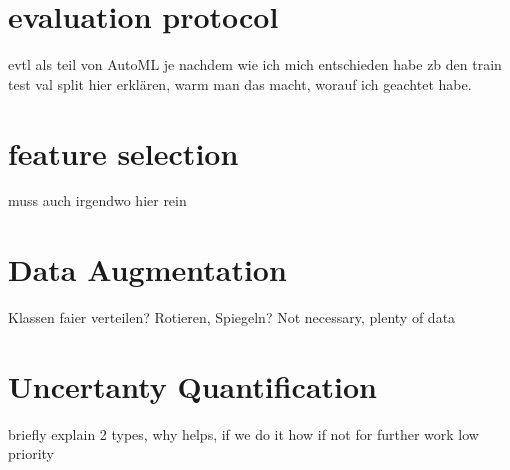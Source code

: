 \section{evaluation protocol}
    evtl als teil von AutoML je nachdem wie ich mich entschieden habe
    zb den train test val split hier  erklären, warm man das macht, worauf ich geachtet habe.
\section{feature selection} muss auch irgendwo hier rein
\section{Data Augmentation}
Klassen faier verteilen? Rotieren, Spiegeln? Not necessary, plenty  of data
\section{Uncertanty Quantification}
briefly explain 2 types, why helps, if we do it how if not for further work low priority
